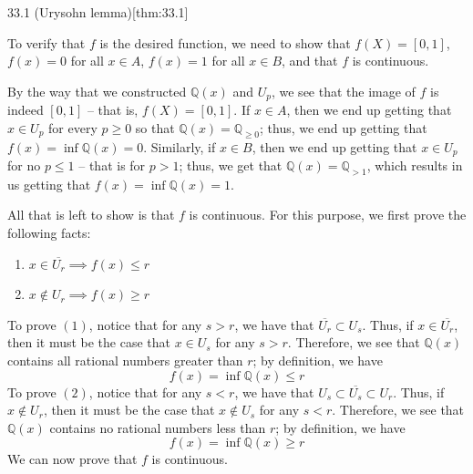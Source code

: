 \begin{thmBox}{33.1 (Urysohn lemma)}[thm:33.1]
\begin{proofBox}
        \baseSkip
        To verify that \( f \) is the desired function, we need to show that 
        \( f ( X ) = [ 0, 1 ] \), \( f ( x ) = 0 \) for all \( x \in A \), 
        \( f ( x ) = 1 \) for all \( x \in B \), and that \( f \) is continuous.

        \baseSkip

        By the way that we constructed \( \mathbb{Q} ( x ) \) and \( U_{ p } \), we see
        that the image of \( f \) is indeed \( [ 0, 1 ] \) -- that is, 
        \( f ( X ) = [ 0, 1 ] \).
        If \( x \in A \), then we end up getting that \( x \in U_{ p } \) for every
        \( p \geq 0 \) so that \( \mathbb{Q} ( x ) = \mathbb{Q}_{ \geq 0 } \); thus,
        we end up getting that \( f ( x ) = \inf \mathbb{Q} ( x ) = 0 \).
        Similarly, if \( x \in B \), then we end up getting that \( x \in U_{ p } \) for no \( p \leq 1 \) -- that is for \( p > 1 \); thus, we get that
        \( \mathbb{Q} ( x ) = \mathbb{Q}_{ > 1 } \), which results in us getting that
        \( f ( x ) = \inf \mathbb{Q} ( x ) = 1 \).

        \baseSkip

        All that is left to show is that \( f \) is continuous.
        For this purpose, we first prove the following facts:
        \begin{enumerate}
            \item \( x \in \overline{ U_{ r } } \implies f ( x ) \leq r \)
            \item \( x \notin U_{ r } \implies f ( x ) \geq r \)
        \end{enumerate}
        To prove \( ( 1 ) \), notice that for any \( s > r \), we have that 
        \( \overline{ U_{ r } } \subset U_{ s } \).
        Thus, if \( x \in \overline{ U_{ r } } \), then it must be the case that 
        \( x \in U_{ s } \) for any \( s > r \).
        Therefore, we see that \( \mathbb{Q} ( x ) \) contains all rational numbers
        greater than \( r \); by definition, we have 
        \begin{equation*}
            f ( x ) = \inf \mathbb{Q} ( x ) \leq r
        \end{equation*}
        To prove \( ( 2 ) \), notice that for any \( s < r \), we have that 
        \( U_{ s } \subset \overline{ U_{ s } } \subset U_{ r } \).
        Thus, if \( x \notin U_{ r } \), then it must be the case that 
        \( x \notin U_{ s } \) for any \( s < r \).
        Therefore, we see that \( \mathbb{Q} ( x ) \) contains no rational numbers
        less than \( r \); by definition, we have 
        \begin{equation*}
            f ( x ) = \inf \mathbb{Q} ( x ) \geq r
        \end{equation*}
        We can now prove that \( f \) is continuous.


\end{proofBox}
\end{thmBox}
